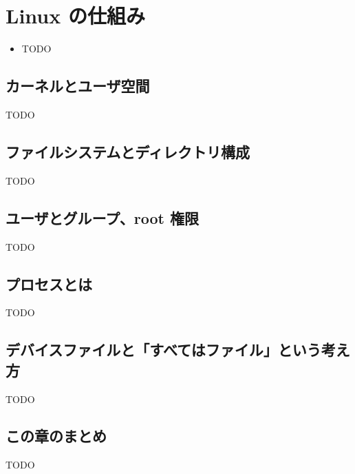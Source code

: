 \chapter{Linux の仕組み}
\label{chap:linux_internals}

\begin{goalbox}
  \begin{itemize}
    \item TODO
  \end{itemize}
\end{goalbox}

\section{カーネルとユーザ空間}

TODO

\section{ファイルシステムとディレクトリ構成}

TODO

\section{ユーザとグループ、root 権限}

TODO

\section{プロセスとは}

TODO

\section{デバイスファイルと「すべてはファイル」という考え方}

TODO

\section*{この章のまとめ}

TODO
